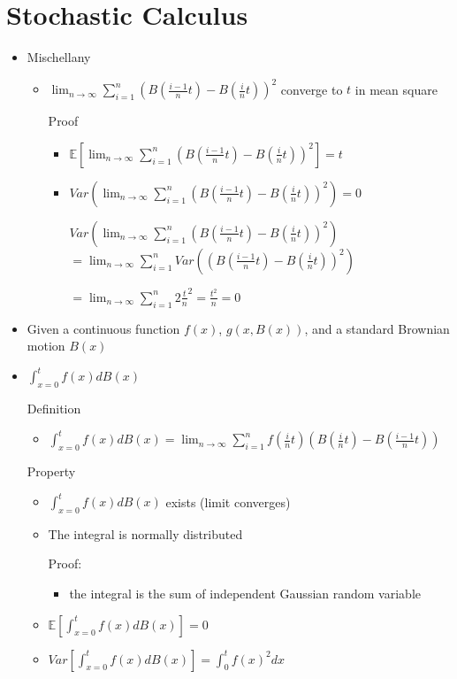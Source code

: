 \documentclass[a4paper]{article}
\begin{document}
\section{Stochastic Calculus}
\begin{itemize}
    \item Mischellany
        \begin{itemize}
            \item $\lim_{n \rightarrow \infty} \sum_{i=1}^n (B(\frac{i-1}{n}t) - B(\frac{i}{n}t))^2$ converge to $t$ in mean square

                Proof
                \begin{itemize}
                    \item $\mathbb{E}[\lim_{n \rightarrow \infty} \sum_{i=1}^n (B(\frac{i-1}{n}t) - B(\frac{i}{n}t))^2] = t$
                    \item $\mathit{Var}(\lim_{n \rightarrow \infty} \sum_{i=1}^n (B(\frac{i-1}{n}t) - B(\frac{i}{n}t))^2) = 0$

                    $\mathit{Var}(\lim_{n \rightarrow \infty} \sum_{i=1}^n (B(\frac{i-1}{n}t) - B(\frac{i}{n}t))^2)$
                    $= \lim_{n \rightarrow \infty} \sum_{i=1}^n \mathit{Var}((B(\frac{i-1}{n}t) - B(\frac{i}{n}t))^2)$

                    $= \lim_{n \rightarrow \infty} \sum_{i=1}^n 2 \frac{t}{n}^2 = \frac{t^2}{n} = 0$
                \end{itemize}
        \end{itemize}
    \item Given a continuous function $f(x)$, $g(x, B(x))$, and a standard Brownian motion $B(x)$
    \item $\int_{x=0}^t f(x) dB(x)$

        Definition
        \begin{itemize}
            \item $\int_{x=0}^t f(x) dB(x) = \lim_{n \rightarrow \infty} \sum_{i=1}^n f(\frac{i}{n}t)(B(\frac{i}{n}t) - B(\frac{i-1}{n}t))$
        \end{itemize}
        Property
        \begin{itemize}
            \item $\int_{x=0}^t f(x) dB(x)$ exists (limit converges)
            \item The integral is normally distributed

                Proof:
                \begin{itemize}
                    \item the integral is the sum of independent Gaussian random variable
                \end{itemize}
            \item $\mathbb{E}[\int_{x=0}^t f(x) dB(x)] = 0$
            \item $\mathit{Var}[\int_{x=0}^t f(x) dB(x)] = \int_0^t f(x)^2 dx$


\end{itemize}
\end{itemize}
\end{document}
